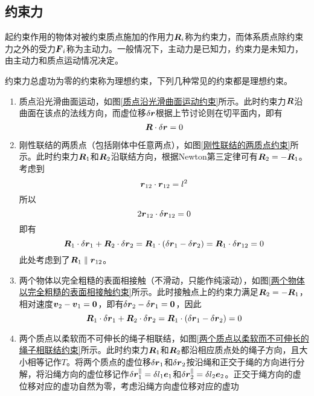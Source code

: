 \subsection{约束力}

起约束作用的物体对被约束质点施加的作用力$\boldsymbol{R}_i$称为{\heiti 约束力}，而体系质点除约束力之外的受力$\boldsymbol{F}_i$称为{\heiti 主动力}。一般情况下，主动力是已知力，约束力是未知力，由主动力和质点运动情况决定。

约束力总虚功为零的约束称为{\heiti 理想约束}，下列几种常见的约束都是理想约束。
\begin{enumerate}
	\item 质点沿光滑曲面运动，如图\ref{质点沿光滑曲面运动约束}所示。此时约束力$\boldsymbol{R}$沿曲面在该点的法线方向，而虚位移$\delta \boldsymbol{r}$根据上节讨论则在切平面内，即有
	\begin{equation*}
		\boldsymbol{R} \cdot \delta \boldsymbol{r} = 0
	\end{equation*}
	\item 刚性联结的两质点（包括刚体中任意两点），如图\ref{刚性联结的两质点约束}所示。此时约束力$\boldsymbol{R}_1$和$\boldsymbol{R}_2$沿联结方向，根据Newton第三定律可有$\boldsymbol{R}_2=-\boldsymbol{R}_1$。考虑到
	\begin{equation*}
		\boldsymbol{r}_{12} \cdot \boldsymbol{r}_{12} = l^2
	\end{equation*}
	所以
	\begin{equation*}
		2\boldsymbol{r}_{12} \cdot \delta \boldsymbol{r}_{12} = 0
	\end{equation*}
	即有
	\begin{equation*}
		\boldsymbol{R}_1 \cdot \delta \boldsymbol{r}_1 + \boldsymbol{R}_2 \cdot \delta \boldsymbol{r}_2 = \boldsymbol{R}_1 \cdot (\delta \boldsymbol{r}_1 - \delta \boldsymbol{r}_2) = \boldsymbol{R}_1 \cdot \delta \boldsymbol{r}_{12} = 0
	\end{equation*}
	此处考虑到了$\boldsymbol{R}_1 \parallel \boldsymbol{r}_{12}$。
	\item 两个物体以完全粗糙的表面相接触（不滑动，只能作纯滚动），如图\ref{两个物体以完全粗糙的表面相接触约束}所示。此时接触点上的约束力满足$\boldsymbol{R}_2 =- \boldsymbol{R}_1$，相对速度$\boldsymbol{v}_2-\boldsymbol{v}_1= \boldsymbol{0}$，即有$\delta \boldsymbol{r}_2-\delta \boldsymbol{r}_1 = \boldsymbol{0}$，因此
	\begin{equation*}
		\boldsymbol{R}_1 \cdot \delta \boldsymbol{r}_1 + \boldsymbol{R}_2 \cdot \delta \boldsymbol{r}_2 = \boldsymbol{R}_1 \cdot (\delta \boldsymbol{r}_1 - \delta \boldsymbol{r}_2) = 0
	\end{equation*}
	\item 两个质点以柔软而不可伸长的绳子相联结，如图\ref{两个质点以柔软而不可伸长的绳子相联结约束}所示。此时约束力$\boldsymbol{R}_1$和$\boldsymbol{R}_2$都沿相应质点处的绳子方向，且大小相等记作$T$。将两个质点的虚位移$\delta \boldsymbol{r}_1$和$\delta \boldsymbol{r}_2$按沿绳和正交于绳的方向进行分解，将沿绳方向的虚位移记作$\delta \boldsymbol{r}_1^\parallel = \delta l_1\boldsymbol{e}_1$和$\delta \boldsymbol{r}_2^\parallel = \delta l_2 \boldsymbol{e}_2$。正交于绳方向的虚位移对应的虚功自然为零，考虑沿绳方向虚位移对应的虚功

\end{enumerate}
